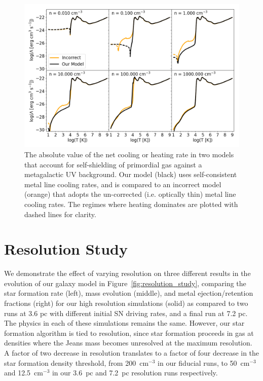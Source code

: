 \documentclass[twocolumn]{aastex61}
\begin{document}
\begin{figure}
\centering
\includegraphics[width=0.95\linewidth]{cooling_model_comparison}
\caption{The absolute value of the net cooling or heating rate 
 in two models that account for self-shielding of primordial gas against a metagalactic UV background. Our model (black) uses self-consistent metal line cooling rates, and is compared to an incorrect model (orange) that adopts the un-corrected (i.e. optically thin) metal line cooling rates. The regimes where heating dominates are plotted with dashed lines for clarity.}
\label{fig:cooling comparison}
\end{figure}

\section{Resolution Study}
\label{appendix:resolution study}
We demonstrate the effect of varying resolution on three different results in the evolution of our galaxy model in Figure~\ref{fig:resolution_study}, comparing the star formation rate (left), mass evolution (middle), and metal ejection/retention fractions (right) for our high resolution simulations (solid) as compared to two runs at 3.6 pc with different initial SN driving rates, and a final run at 7.2 pc. The physics in each of these simulations remains the same. However, our star formation algorithm is tied to resolution, since star formation proceeds in gas at densities where the Jeans mass becomes unresolved at the maximum resolution. A factor of two decrease in resolution translates to a factor of four decrease in the star formation density threshold, from 200~cm$^{-3}$ in our fiducial runs, to 50~cm$^{-3}$ and 12.5~cm$^{-3}$ in our 3.6~pc and 7.2~pc resolution runs respectively. 
\end{document}
